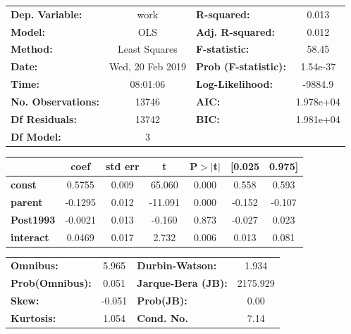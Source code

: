 \documentclass{article}
\begin{document}
\begin{enumerate}[label=\alph*]
\begin{center}
\begin{tabular}{lclc}
\toprule
\textbf{Dep. Variable:}    &       work       & \textbf{  R-squared:         } &     0.013   \\
\textbf{Model:}            &       OLS        & \textbf{  Adj. R-squared:    } &     0.012   \\
\textbf{Method:}           &  Least Squares   & \textbf{  F-statistic:       } &     58.45   \\
\textbf{Date:}             & Wed, 20 Feb 2019 & \textbf{  Prob (F-statistic):} &  1.54e-37   \\
\textbf{Time:}             &     08:01:06     & \textbf{  Log-Likelihood:    } &   -9884.9   \\
\textbf{No. Observations:} &       13746      & \textbf{  AIC:               } & 1.978e+04   \\
\textbf{Df Residuals:}     &       13742      & \textbf{  BIC:               } & 1.981e+04   \\
\textbf{Df Model:}         &           3      & \textbf{                     } &             \\
\bottomrule
\end{tabular}
\begin{tabular}{lcccccc}
                  & \textbf{coef} & \textbf{std err} & \textbf{t} & \textbf{P$>$$|$t$|$} & \textbf{[0.025} & \textbf{0.975]}  \\
\midrule
\textbf{const}    &       0.5755  &        0.009     &    65.060  &         0.000        &        0.558    &        0.593     \\
\textbf{parent}   &      -0.1295  &        0.012     &   -11.091  &         0.000        &       -0.152    &       -0.107     \\
\textbf{Post1993} &      -0.0021  &        0.013     &    -0.160  &         0.873        &       -0.027    &        0.023     \\
\textbf{interact} &       0.0469  &        0.017     &     2.732  &         0.006        &        0.013    &        0.081     \\
\bottomrule
\end{tabular}
\begin{tabular}{lclc}
\textbf{Omnibus:}       &  5.965 & \textbf{  Durbin-Watson:     } &    1.934  \\
\textbf{Prob(Omnibus):} &  0.051 & \textbf{  Jarque-Bera (JB):  } & 2175.929  \\
\textbf{Skew:}          & -0.051 & \textbf{  Prob(JB):          } &     0.00  \\
\textbf{Kurtosis:}      &  1.054 & \textbf{  Cond. No.          } &     7.14  \\
\bottomrule
\end{tabular}
\end{center}


\end{enumerate}
\end{document}
